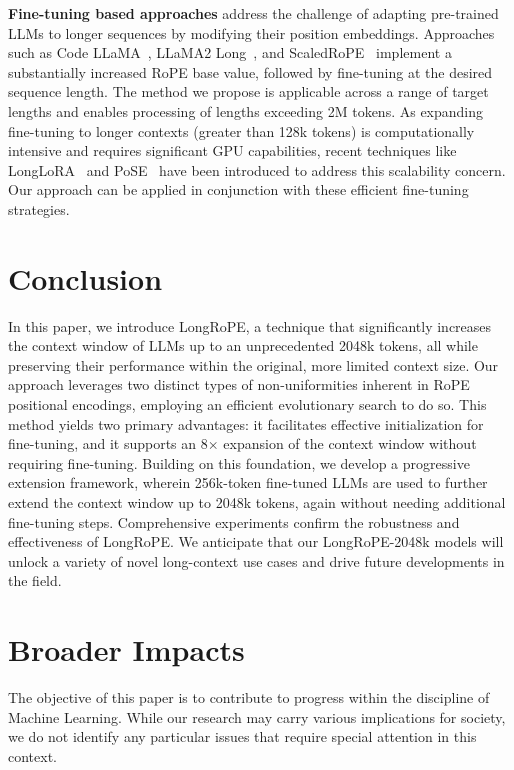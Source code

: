 \textbf{Fine-tuning based approaches} address the challenge of adapting pre-trained LLMs to longer sequences by modifying their position embeddings. Approaches such as Code LLaMA~\cite{codellama}, LLaMA2 Long~\cite{xiong2023effective}, and ScaledRoPE~\cite{liu2023scaling} implement a substantially increased RoPE base value, followed by fine-tuning at the desired sequence length. The method we propose is applicable across a range of target lengths and enables processing of lengths exceeding 2M tokens. As expanding fine-tuning to longer contexts (greater than 128k tokens) is computationally intensive and requires significant GPU capabilities, recent techniques like LongLoRA~\cite{longlora} and PoSE~\cite{zhu2023pose} have been introduced to address this scalability concern. Our approach can be applied in conjunction with these efficient fine-tuning strategies.

\section{Conclusion}

In this paper, we introduce LongRoPE, a technique that significantly increases the context window of LLMs up to an unprecedented 2048k tokens, all while preserving their performance within the original, more limited context size. Our approach leverages two distinct types of non-uniformities inherent in RoPE positional encodings, employing an efficient evolutionary search to do so. This method yields two primary advantages: it facilitates effective initialization for fine-tuning, and it supports an 8$\times$ expansion of the context window without requiring fine-tuning. Building on this foundation, we develop a progressive extension framework, wherein 256k-token fine-tuned LLMs are used to further extend the context window up to 2048k tokens, again without needing additional fine-tuning steps. Comprehensive experiments confirm the robustness and effectiveness of LongRoPE. We anticipate that our LongRoPE-2048k models will unlock a variety of novel long-context use cases and drive future developments in the field.

\section*{Broader Impacts} The objective of this paper is to contribute to progress within the discipline of Machine Learning. While our research may carry various implications for society, we do not identify any particular issues that require special attention in this context.

	\balance

